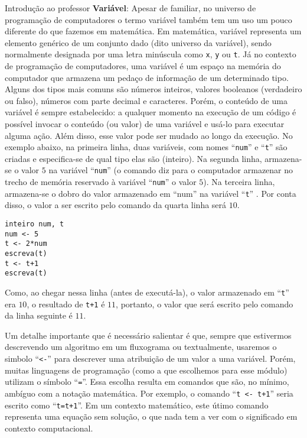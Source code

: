 \begin{apresentacao}{Introdução ao professor}
\textbf{Variável}: Apesar de familiar, no universo de programação de computadores o termo variável também tem um uso um pouco diferente do que fazemos em matemática. Em matemática, variável representa um elemento genérico de um conjunto dado (dito universo da variável), sendo normalmente designada por uma letra minúscula como \verb|x|, \verb|y| ou \verb|t|. Já no contexto de programação de computadores, uma variável é um espaço na memória do computador que armazena um pedaço de informação de um determinado tipo. Alguns dos tipos mais comuns são números inteiros, valores booleanos (verdadeiro ou falso), números com parte decimal e caracteres. Porém, o conteúdo de uma variável é sempre estabelecido: a qualquer momento na execução de um código é possível invocar o conteúdo (ou valor) de uma variável e usá-lo para executar alguma ação. Além disso, esse valor pode ser mudado ao longo da execução. No exemplo abaixo, na primeira linha, duas variáveis, com nomes “\verb|num|” e “\verb|t|” são criadas e especifica-se de qual tipo elas são (inteiro). Na segunda linha, armazena-se o valor $5$ na variável “\verb|num|” (o comando diz para o computador armazenar no trecho de memória reservado à variável “\verb|num|” o valor $5$). Na terceira linha, armazena-se o dobro do valor armazenado em “num” na variável “\verb|t|” . Por conta disso, o valor a ser escrito pelo comando da quarta linha será $10$.

\begin{verbatim}
inteiro num, t
num <- 5
t <- 2*num
escreva(t)
t <- t+1
escreva(t)
\end{verbatim}

Como, ao chegar nessa linha (antes de executá-la), o valor armazenado em “\verb|t|” era $10$, o resultado de \verb|t+1| é $11$, portanto, o valor que será escrito pelo comando da linha seguinte é $11$.

Um detalhe importante que é necessário salientar é que, sempre que estivermos descrevendo um algoritmo em um fluxograma ou textualmente, usaremos o simbolo “\verb|<-|” para descrever uma atribuição de um valor a uma variável. Porém, muitas linguagens de programação (como a que escolhemos para esse módulo) utilizam o símbolo “\verb|=|”. Essa escolha resulta em comandos que são, no mínimo, ambíguo com a notação matemática. Por exemplo, o comando “\verb|t <- t+1|” seria escrito como “\verb|t=t+1|”. Em um contexto matemático, este útimo comando representa uma equação sem solução, o que nada tem a ver com o significado em contexto computacional.


\end{apresentacao}
